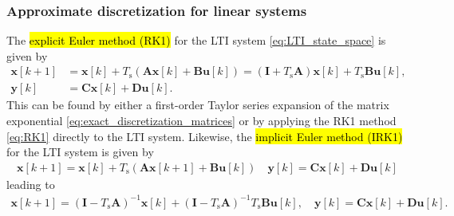\begin{frame}
    \frametitle{Approximate discretization for linear systems}
    The \hl{explicit Euler method (RK1)} for the LTI system \eqref{eq:LTI_state_space} is given by
    \begin{equation}
        \begin{split}
            \bm{x}[k+1] & = \bm{x}[k] + T_\mathrm{s}(\bm{A}\bm{x}[k] + \bm{B}\bm{u}[k]) = (\bm{I} + T_\mathrm{s}\bm{A})\bm{x}[k] + T_\mathrm{s}\bm{B}\bm{u}[k], \\
            \bm{y}[k]   & = \bm{C}\bm{x}[k] + \bm{D}\bm{u}[k].
        \end{split}
    \end{equation}\pause
    This can be found by either a first-order Taylor series expansion of the matrix exponential \eqref{eq:exact_discretization_matrices} or by applying the RK1 method \eqref{eq:RK1} directly to the LTI system. \pause Likewise, the \hl{implicit Euler method (IRK1)} for the LTI system is given by
    \begin{equation}
        \begin{split}
            \bm{x}[k+1]  = \bm{x}[k] + T_\mathrm{s}(\bm{A}\bm{x}[k+1] + \bm{B}\bm{u}[k])\quad             \bm{y}[k]    = \bm{C}\bm{x}[k] + \bm{D}\bm{u}[k]
        \end{split}
    \end{equation}\pause
    leading to
    \begin{equation}
        \begin{split}
            \bm{x}[k+1]  = (\bm{I} - T_\mathrm{s}\bm{A})^{-1}\bm{x}[k] + (\bm{I} - T_\mathrm{s}\bm{A})^{-1}T_\mathrm{s}\bm{B}\bm{u}[k], \quad
            \bm{y}[k]    = \bm{C}\bm{x}[k] + \bm{D}\bm{u}[k].
        \end{split}
    \end{equation}

\end{frame}